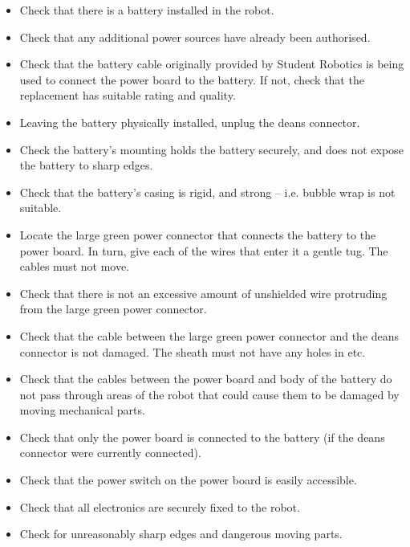 \begin{itemize}
\item Check that there is a battery installed in the robot.
\item Check that any additional power sources have already been authorised.
\item Check that the battery cable originally provided by Student Robotics is being used to connect the power board to the battery. If not, check that the replacement has suitable rating and quality.
\item Leaving the battery physically installed, unplug the deans connector.
\item Check the battery's mounting holds the battery securely, and does not expose the battery to sharp edges.
\item Check that the battery's casing is rigid, and strong -- i.e. bubble wrap is not suitable.
\item Locate the large green power connector that connects the battery to the power board. In turn, give each of the wires that enter it a gentle tug. The cables must not move.
\item Check that there is not an excessive amount of unshielded wire protruding from the large green power connector.
\item Check that the cable between the large green power connector and the deans connector is not damaged. The sheath must not have any holes in etc.
\item Check that the cables between the power board and body of the battery do not pass through areas of the robot that could cause them to be damaged by moving mechanical parts.
\item Check that only the power board is connected to the battery (if the deans connector were currently connected).
\item Check that the power switch on the power board is easily accessible.
\item Check that all electronics are securely fixed to the robot.
\item Check for unreasonably sharp edges and dangerous moving parts.
\end{itemize}
